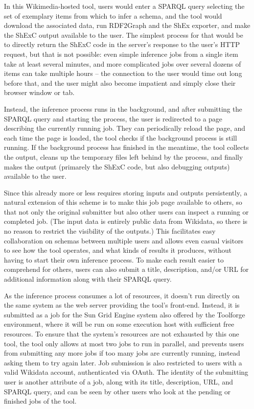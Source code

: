 In this Wikimedia-hosted tool,
users would enter a SPARQL query selecting the set of exemplary items from which to infer a schema,
and the tool would download the associated data,
run RDF2Graph and the ShEx exporter,
and make the ShExC output available to the user.
The simplest process for that would be
to directly return the ShExC code in the server’s response to the user’s HTTP request,
but that is not possible:
even simple inference jobs %
from a single item take at least several minutes,
and more complicated jobs %
over several dozens of items can take multiple hours –
the connection to the user would time out long before that,
and the user might also become impatient and simply close their browser window or tab.

Instead, the inference process runs in the background,
and after submitting the SPARQL query and starting the process,
the user is redirected to a page describing the currently running job.
They can periodically reload the page,
and each time the page is loaded,
the tool checks if the background process is still running.
If the background process has finished in the meantime,
the tool collects the output,
cleans up the temporary files left behind by the process,
and finally makes the output
(primarely the ShExC code, but also debugging outputs)
available to the user.

Since this already more or less requires storing inputs and outputs persistently,
a natural extension of this scheme is to make this job page available to others,
so that not only the original submitter but also other users can inspect a running or completed job.
(The input data is entirely public data from Wikidata,
so there is no reason to restrict the visibility of the outputs.)
This facilitates easy collaboration on schemas between multiple users
and allows even casual visitors to see how the tool operates,
and what kinds of results it produces,
without having to start their own inference process.
To make each result easier to comprehend for others,
users can also submit a title, description, and/or URL for additional information
along with their SPARQL query. %

As the inference process consumes a lot of resources,
it doesn’t run directly on the same system as the web server providing the tool’s front-end.
Instead, it is submitted as a job for the Sun Grid Engine system also offered by the Toolforge environment,
where it will be run on some execution host with sufficient free resources.
To ensure that the system’s resources are not exhausted by this one tool,
the tool only allows at most two jobs to run in parallel,
and prevents users from submitting any more jobs if too many jobs are currently running,
instead asking them to try again later.
Job submission is also restricted to users with a valid Wikidata account,
authenticated via OAuth.
The identity of the submitting user is another attribute of a job,
along with its title, description, URL, and SPARQL query,
and can be seen by other users who look at the pending or finished jobs of the tool.


